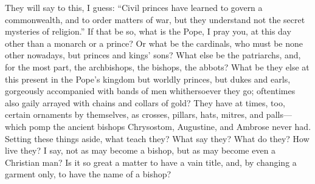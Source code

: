 They will say to this, I guess: “Civil princes have learned
to govern a commonwealth, and to order matters of war, but they understand
not the secret mysteries of religion.” If that be so, what
is the Pope, I pray you, at this day other than a monarch or a prince?
Or what be the cardinals, who must be none other nowadays, but princes
and kings’ sons? What else be the patriarchs, and, for the
most part, the archbishops, the bishops, the abbots? What be they
else at this present in the Pope’s kingdom but worldly princes,
but dukes and earls, gorgeously accompanied with bands of men whithersoever
they go; oftentimes also gaily arrayed with chains and collars of gold?
They have at times, too, certain ornaments by themselves, as crosses,
pillars, hats, mitres, and palls—which pomp the ancient bishops
Chrysostom, Augustine, and Ambrose never had. Setting these things
aside, what teach they? What say they? What do they?
How live they? I say, not as may become a bishop, but as may become
even a Christian man? Is it so great a matter to have a vain title,
and, by changing a garment only, to have the name of a bishop?

